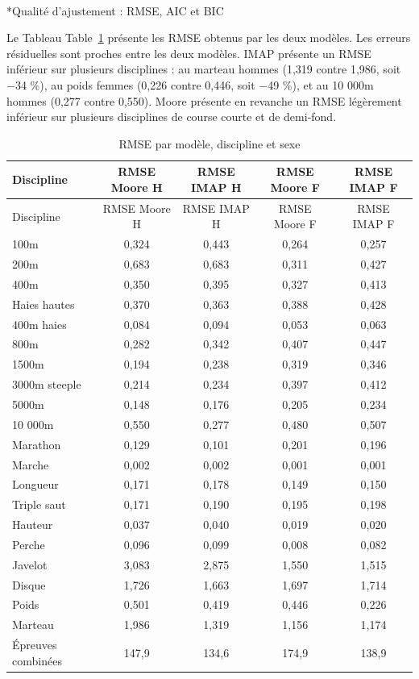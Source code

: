 \documentclass[
  french,
  11pt,
  a4paper,
]{article}
\makeatletter
\let\oldparagraph\paragraph
\renewcommand{\paragraph}{
    \@ifstar
      \xxxParagraphStar
      \xxxParagraphNoStar
  }
\newcommand{\xxxParagraphStar}[1]{\oldparagraph*{#1}\mbox{}}
\newcommand{\xxxParagraphNoStar}[1]{\oldparagraph{#1}\mbox{}}
\makeatother
\begin{document}
\paragraph*{Qualité d'ajustement : RMSE, AIC et
BIC}\label{qualituxe9-dajustement-rmse-aic-et-bic}

Le Tableau Table~\ref{tbl-comparatif-rmse} présente les RMSE obtenus par
les deux modèles. Les erreurs résiduelles sont proches entre les deux
modèles. IMAP présente un RMSE inférieur sur plusieurs disciplines : au
marteau hommes (1,319 contre 1,986, soit −34 \%), au poids femmes (0,226
contre 0,446, soit −49 \%), et au 10 000m hommes (0,277 contre 0,550).
Moore présente en revanche un RMSE légèrement inférieur sur plusieurs
disciplines de course courte et de demi-fond.

\begin{longtable}[]{@{}lcccc@{}}
\caption{RMSE par modèle, discipline et
sexe}\label{tbl-comparatif-rmse}\tabularnewline
\toprule\noalign{}
Discipline & RMSE Moore H & RMSE IMAP H & RMSE Moore F & RMSE IMAP F \\
\midrule\noalign{}
\endfirsthead
\toprule\noalign{}
Discipline & RMSE Moore H & RMSE IMAP H & RMSE Moore F & RMSE IMAP F \\
\midrule\noalign{}
\endhead
\bottomrule\noalign{}
\endlastfoot
100m & 0,324 & 0,443 & 0,264 & 0,257 \\
200m & 0,683 & 0,683 & 0,311 & 0,427 \\
400m & 0,350 & 0,395 & 0,327 & 0,413 \\
Haies hautes & 0,370 & 0,363 & 0,388 & 0,428 \\
400m haies & 0,084 & 0,094 & 0,053 & 0,063 \\
800m & 0,282 & 0,342 & 0,407 & 0,447 \\
1500m & 0,194 & 0,238 & 0,319 & 0,346 \\
3000m steeple & 0,214 & 0,234 & 0,397 & 0,412 \\
5000m & 0,148 & 0,176 & 0,205 & 0,234 \\
10 000m & 0,550 & 0,277 & 0,480 & 0,507 \\
Marathon & 0,129 & 0,101 & 0,201 & 0,196 \\
Marche & 0,002 & 0,002 & 0,001 & 0,001 \\
Longueur & 0,171 & 0,178 & 0,149 & 0,150 \\
Triple saut & 0,171 & 0,190 & 0,195 & 0,198 \\
Hauteur & 0,037 & 0,040 & 0,019 & 0,020 \\
Perche & 0,096 & 0,099 & 0,008 & 0,082 \\
Javelot & 3,083 & 2,875 & 1,550 & 1,515 \\
Disque & 1,726 & 1,663 & 1,697 & 1,714 \\
Poids & 0,501 & 0,419 & 0,446 & 0,226 \\
Marteau & 1,986 & 1,319 & 1,156 & 1,174 \\
Épreuves combinées & 147,9 & 134,6 & 174,9 & 138,9 \\
\end{longtable}
\end{document}
